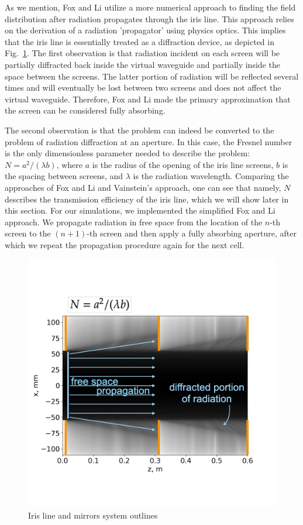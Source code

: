     As we mention, Fox and Li utilize a more numerical approach to finding the field distribution after radiation propagates through the iris line. This approach relies on the derivation of a radiation 'propagator' using physics optics. This implies that the iris line is essentially treated as a diffraction device, as depicted in Fig.~\ref{Fig:difraction_outline}. The first observation is that radiation incident on each screen will be partially diffracted back inside the virtual waveguide and partially inside the space between the screens. The latter portion of radiation will be reflected several times and will eventually be lost between two screens and does not affect the virtual waveguide. Therefore, Fox and Li made the primary approximation that the screen can be considered fully absorbing. 
    
    The second observation is that the problem can indeed be converted to the problem of radiation diffraction at an aperture. In this case, the Fresnel number is the only dimensionless parameter needed to describe the problem: $N = a^2 / (\lambda b)$, where $a$ is the radius of the opening of the iris line screens, $b$ is the spacing between screens, and $\lambda$ is the radiation wavelength. Comparing the approaches of Fox and Li and Vainstein's approach, one can see that namely, $N$ describes the transmission efficiency of the iris line, which we will show later in this section. For our simulations, we implemented the simplified Fox and Li approach. We propagate radiation in free space from the location of the $n$-th screen to the $(n+1)$-th screen and then apply a fully absorbing aperture, after which we repeat the propagation procedure again for the next cell.
    \begin{figure}[h!]
    	\centering
    		\includegraphics[trim={0 5cm 0 0cm}, width=0.75\linewidth]{content/images/transport/difraction_outline.jpeg}
    		\centering
            \captionsetup{justification=centering}
        	\caption{Iris line and mirrors system outlines}
        \label{Fig:difraction_outline}
    \end{figure}
    
